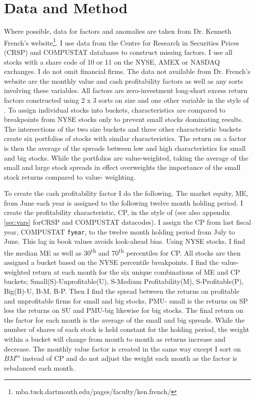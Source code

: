 
\section{Data and Method}

Where possible, data for factors and anomalies are taken from Dr. Kenneth French's
website\footnote{mba.tuck.dartmouth.edu/pages/faculty/ken.french/}. I use data from the
Centre for Research in Securities Prices (CRSP) and COMPUSTAT databases to construct
missing factors. I use all stocks with a share code of 10 or 11 on the NYSE, AMEX or
NASDAQ exchanges. I do not omit financial firms. The data not available from Dr. French's
website are the monthly value and cash profitability factors as well as any sorts
involving these variables. All factors are zero-investment long-short excess return
factors constructed using 2 x 3 sorts on size and one other variable in the style of
\textcite{fama1992cross}. To assign individual stocks into buckets, characteristics are
compared to breakpoints from NYSE stocks only to prevent small stocks dominating results.
The intersections of the two size buckets and three other characteristic buckets create
six portfolios of stocks with similar characteristics. The return on a factor is then the
average of the spreads between low and high characteristics for small and big stocks.
While the portfolios are value-weighted, taking the average of the small and large stock
spreads in effect overweights the importance of the small stock returns compared to value-
weighting.

To create the cash profitability factor I do the following. The market equity, ME, from
June each year is assigned to the following twelve month holding period. I create the
profitability characteristic, CP,  in the style of \textcite{ball2016accruals} (see also
appendix \ref{sec:vars} forCRSP and COMPUSTAT datacodes). I assign the CP from last fiscal
year, COMPUSTAT \texttt{fyear}, to the twelve month holding period from July to June. This
lag in book values avoids look-ahead bias. Using NYSE stocks, I find the median ME as well
as 30\textsuperscript{th} and 70\textsuperscript{th} percentiles for CP. All stocks are
then assigned a bucket based on the NYSE percentile breakpoints. I find the value-weighted
return at each month for the six unique combinations of ME and CP buckets;
Small(S)-Unprofitable(U), S-Medium Profitability(M), S-Profitable(P), Big(B)-U, B-M, B-P.
Then I find the spread between the returns on profitable and unprofitable firms for small
and big stocks, PMU- small is the returns on SP less the returns on SU and PMU-big
likewise for big stocks. The final return on the factor for each month is the average of
the small and big spreads. While the number of shares of each stock is held constant for
the holding period, the weight within a bucket will change from month to month as returns
increase and decrease. The monthly value factor is created in the same way except I sort
on $BM^m$ instead of CP and do not adjust the weight each month as the factor is
rebalanced each month.

